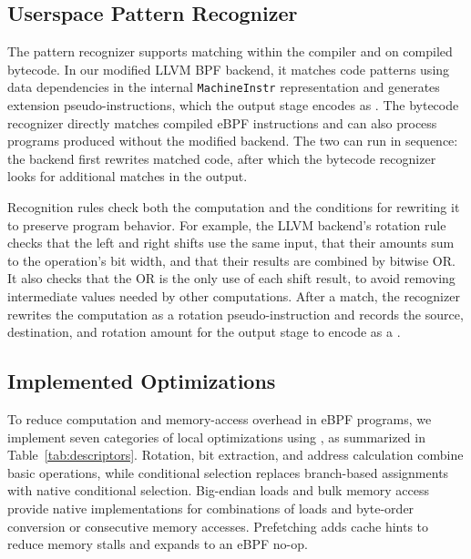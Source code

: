 

\subsection{Userspace Pattern Recognizer}
\label{subsec:llvm}

The pattern recognizer supports matching within the compiler and on compiled bytecode. In our modified LLVM BPF backend, it matches code patterns using data dependencies in the internal \texttt{MachineInstr} representation and generates extension pseudo-instructions, which the output stage encodes as \kinsns. The bytecode recognizer directly matches compiled eBPF instructions and can also process programs produced without the modified backend. The two can run in sequence: the backend first rewrites matched code, after which the bytecode recognizer looks for additional matches in the output.

Recognition rules check both the computation and the conditions for rewriting it to preserve program behavior. For example, the LLVM backend's rotation rule checks that the left and right shifts use the same input, that their amounts sum to the operation's bit width, and that their results are combined by bitwise OR. It also checks that the OR is the only use of each shift result, to avoid removing intermediate values needed by other computations. After a match, the recognizer rewrites the computation as a rotation pseudo-instruction and records the source, destination, and rotation amount for the output stage to encode as a \kinsn.

\subsection{Implemented Optimizations}
\label{subsec:descriptors}
\label{subsec:operations}
\label{sec:lang}
\label{subsec:adding}

To reduce computation and memory-access overhead in eBPF programs, we implement seven categories of local optimizations using \kinsns, as summarized in Table~\ref{tab:descriptors}. Rotation, bit extraction, and address calculation combine basic operations, while conditional selection replaces branch-based assignments with native conditional selection. Big-endian loads and bulk memory access provide native implementations for combinations of loads and byte-order conversion or consecutive memory accesses. Prefetching adds cache hints to reduce memory stalls and expands to an eBPF no-op.

